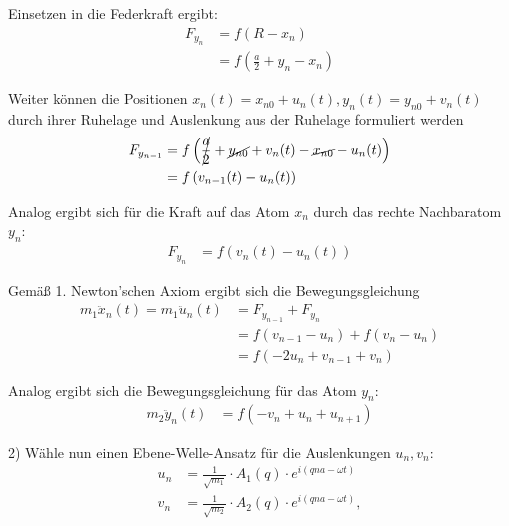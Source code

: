 \documentclass{article}
\newcommand{\lr}[1]{\left(#1\right)}
\begin{document}
{	Einsetzen in die Federkraft ergibt:
		\begin{align*}
			F_{y_n} &= f( R - x_n) \\
			&= f \lr{ \frac{a}{2} + y_n - x_n }
		\end{align*}

	Weiter können die Positionen $x_n(t) = x_{n0} + u_n(t), y_n(t) = y_{n0} + v_n(t)$ durch ihrer Ruhelage und Auslenkung aus der Ruhelage formuliert werden
		\begin{align*}
			F_{y_{n-1}} &= f \lr{ \cancel{ \frac{a}{2} } + \cancel{ y_{n0} } + v_n(t) - \cancel{ x_{n0} } - u_n(t) } \\
			&= f \lr{ v_{n-1}(t) - u_n(t) }
		\end{align*}


\newpage


	Analog ergibt sich für die Kraft auf das Atom $x_n$ durch das rechte Nachbaratom $y_n$:
		\begin{align*}
			F_{y_n} &= f \lr{ v_n(t) - u_n(t) }
		\end{align*}
	
	Gemäß 1. Newton'schen Axiom ergibt sich die Bewegungsgleichung
		\begin{align*}
			m_1 \ddot{x}_n(t) = m_1 \ddot{u}_n(t) &= F_{y_{n-1}} + F_{y_n} \\
			&= f \lr{ v_{n-1} - u_n } + f \lr{ v_n - u_n } \\
	 		&= f \lr{ -2u_n + v_{n-1} + v_n }
		\end{align*}

	Analog ergibt sich die Bewegungsgleichung für das Atom $y_n$:
		\begin{align*}
			m_2 \ddot{y}_n(t) &= f \lr{ -v_n + u_n + u_{n+1} }
		\end{align*}
		
	2) Wähle nun einen Ebene-Welle-Ansatz für die Auslenkungen $u_n, v_n$:
		\begin{align*}
			u_n &= \frac{1}{\sqrt{m_1}} \cdot A_1(q) \cdot e^{i(qna - \omega t)} \\
			v_n &= \frac{1}{\sqrt{m_2}} \cdot A_2(q) \cdot e^{i(qna - \omega t)},
		\end{align*}
	
}
\end{document}
